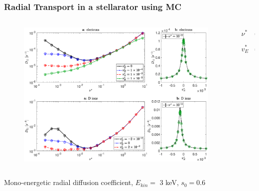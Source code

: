 \documentclass{beamer}
\newcommand{\bea}[1]{\begin{eqnarray} \label{#1}}
\newcommand{\eea}{\end{eqnarray}}
\begin{document}
\begin{frame}
\frametitle{Radial Transport in a stellarator using MC}
\vspace{-1.2cm}
\hspace*{0.1cm}
\begin{columns}[t]
	\begin{column}{0.8\textwidth}
		\begin{figure}
			\vspace*{-1.05cm}
\hspace*{-0.5cm}\includegraphics[width=1\textwidth]{FIGURES/transport_coefficient_electrons_dions.eps}

\end{figure}
\end{column}
\hspace*{-1cm}
\begin{column}{0.2\textwidth}
	\vspace*{0.8cm}
	\bea*{} 
		\nu^{\ast} &=& \frac{R_0 \nu_c}{\iota v} \nonumber \\
		\quad \nonumber \\ 
		v_E^{\ast} &=& \frac{E_r}{v B_0} \nonumber
	\eea
	
	\end{column}
\end{columns}
Mono-energetic radial diffusion coefficient,\newline
$E_{kin}=$ 3 keV, $s_0 = 0.6$
\end{frame}
\end{document}
